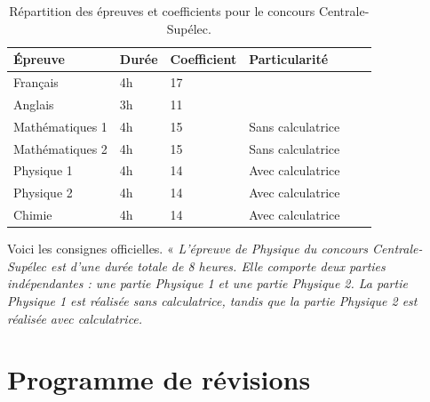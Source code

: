 \documentclass[12pt,fancy]{cours}
\begin{document}

\begin{table}[H]
  \centering
  \begin{tabular}{|l|l|l|l|l|l|}
    \hline
    Épreuve & Durée & Coefficient & Particularité\\
    \hline
    Français & 4h & 17  & \\
    Anglais & 3h & 11 & \\ 
    Mathématiques 1 & 4h & 15 & Sans calculatrice \\
    Mathématiques 2 & 4h & 15 & Sans calculatrice \\
    Physique 1 & 4h & 14 & Avec calculatrice \\
    Physique 2 & 4h & 14 & Avec calculatrice \\
    Chimie & 4h & 14 & Avec calculatrice \\
    \hline
  \end{tabular}
  \caption{Répartition des épreuves et coefficients pour le concours Centrale-Supélec.}
  \label{tab:coefficients_CCS}
\end{table}

 Voici les consignes officielles.
«\emph{
  L’épreuve de Physique du concours Centrale-Supélec est d’une durée totale de 8 heures. Elle comporte deux parties indépendantes : une partie Physique 1 et une partie Physique 2. La partie Physique 1 est réalisée sans calculatrice, tandis que la partie Physique 2 est réalisée avec calculatrice.}

\section{Programme de révisions}
\end{document}

